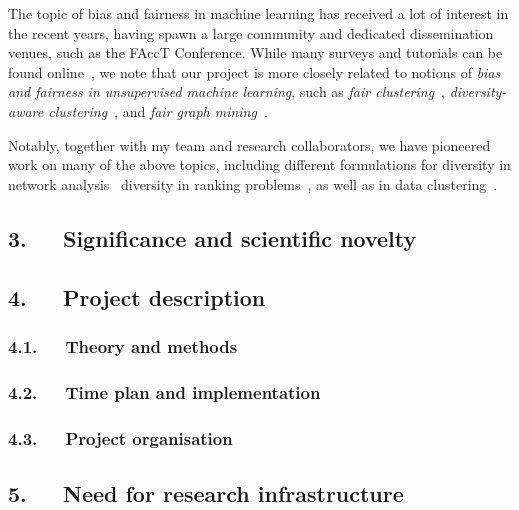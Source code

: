 \documentclass[a4paper,11pt]{article}
\begin{document}

The topic of bias and fairness in machine learning has received a lot of interest in the recent years, 
having spawn a large community and dedicated dissemination venues, such as the FAccT Conference. 
While many surveys and tutorials can be found online~\cite{caton2020fairness,mehrabi2021survey}, 
we note that our project is more closely related to notions of
\emph{bias and fairness in unsupervised machine learning}, 
such as 
\emph{fair clustering}~\cite{chierichetti2017fair}, 
\emph{diversity-aware clustering}~\cite{thejaswi2021diversity}, 
and \emph{fair graph mining}~\cite{dong2023fairness}.


Notably, together with my team and research collaborators, 
we have pioneered work on many of the above topics,
including
different formulations for diversity in network analysis~\cite{adriaens2023minimizing,cinus2023rebalancing,coupette2023reducing,oettershagen2024finding}
diversity in ranking problems~\cite{zhang2022ranking}, 
as well as in data clustering~\cite{thejaswi2021diversity}.

\subsection*{3.~~~Significance and scientific novelty}

\subsection*{4.~~~Project description}


\subsubsection*{4.1.~~~Theory and methods}

\subsubsection*{4.2.~~~Time plan and implementation}

\subsubsection*{4.3.~~~Project organisation}



\subsection*{5.~~~Need for research infrastructure}
\end{document}
